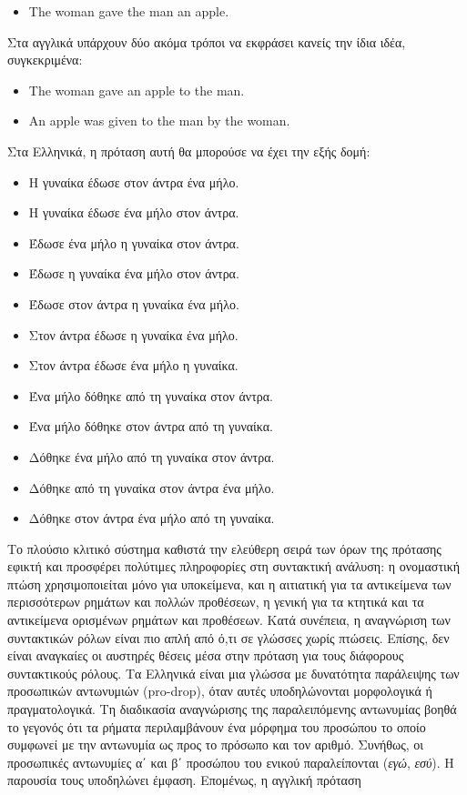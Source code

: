 \begin{multicols}{2}
\begin{itemize}
\item[] The woman gave the man an apple.
\end{itemize}

Στα αγγλικά υπάρχουν δύο ακόμα τρόποι να εκφράσει κανείς την ίδια ιδέα, συγκεκριμένα:

\begin{itemize}
\item The woman gave an apple to the man.
\item An apple was given to the man by the woman.
\end{itemize}

Στα Ελληνικά, η πρόταση αυτή θα μπορούσε να έχει την εξής δομή:

\begin{itemize}    
\item Η γυναίκα έδωσε στον άντρα ένα μήλο.
\item Η γυναίκα έδωσε ένα μήλο στον άντρα.
\item Έδωσε ένα μήλο η γυναίκα στον άντρα.
\item Έδωσε η γυναίκα ένα μήλο στον άντρα.
\item Έδωσε στον άντρα η γυναίκα ένα μήλο.
\item Στον άντρα έδωσε η γυναίκα ένα μήλο.
\item Στον άντρα έδωσε ένα μήλο η γυναίκα.
\item Ένα μήλο δόθηκε από τη γυναίκα στον άντρα.
\item Ένα μήλο δόθηκε στον άντρα από τη γυναίκα.
\item Δόθηκε ένα μήλο από τη γυναίκα στον άντρα.
\item Δόθηκε από τη γυναίκα στον άντρα ένα μήλο.
\item Δόθηκε στον άντρα ένα μήλο από τη γυναίκα.
\end{itemize}

Το πλούσιο κλιτικό σύστημα καθιστά την ελεύθερη σειρά των όρων της πρότασης εφικτή και προσφέρει πολύτιμες πληροφορίες στη συντακτική ανάλυση: η ονομαστική πτώση χρησιμοποιείται μόνο για υποκείμενα, και η αιτιατική για τα αντικείμενα των περισσότερων ρημάτων και πολλών προθέσεων, η γενική για τα κτητικά και τα αντικείμενα ορισμένων ρημάτων και προθέσεων. Κατά συνέπεια, η αναγνώριση των συντακτικών ρόλων είναι πιο απλή από ό,τι σε γλώσσες χωρίς πτώσεις. Επίσης, δεν είναι αναγκαίες οι αυστηρές θέσεις μέσα στην πρόταση για τους διάφορους συντακτικούς ρόλους.  
Τα Ελληνικά είναι μια γλώσσα με δυνατότητα παράλειψης των προσωπικών αντωνυμιών (pro-drop), όταν αυτές υποδηλώνονται μορφολογικά ή πραγματολογικά. Τη διαδικασία αναγνώρισης της παραλειπόμενης αντωνυμίας βοηθά το γεγονός ότι τα ρήματα περιλαμβάνουν ένα μόρφημα του προσώπου το οποίο συμφωνεί με την αντωνυμία ως προς το πρόσωπο και τον αριθμό. Συνήθως, οι προσωπικές αντωνυμίες α΄ και β΄ προσώπου του ενικού παραλείπονται (\textit{εγώ}, \textit{εσύ}). Η παρουσία τους υποδηλώνει έμφαση. Επομένως, η αγγλική πρόταση


\end{multicols}
